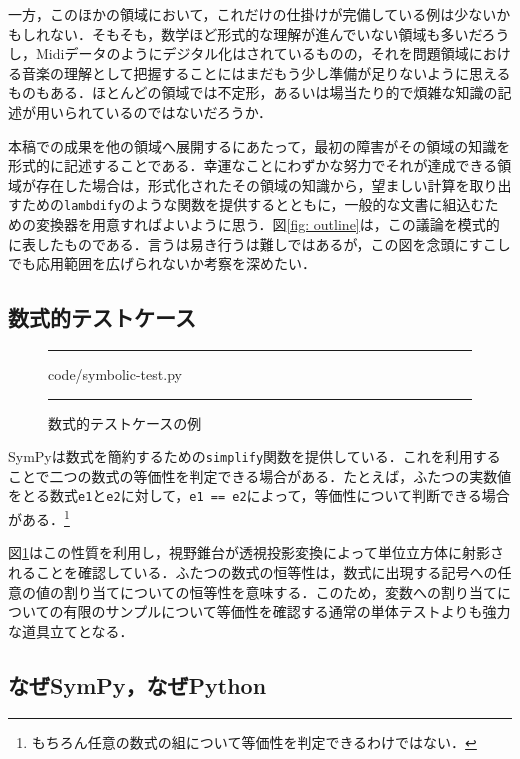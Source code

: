 一方，このほかの領域において，これだけの仕掛けが完備している例は少ないかもしれない．そもそも，数学ほど形式的な理解が進んでいない領域も多いだろうし，Midiデータのようにデジタル化はされているものの，それを問題領域における音楽の理解として把握することにはまだもう少し準備が足りないように思えるものもある．ほとんどの領域では不定形，あるいは場当たり的で煩雑な知識の記述が用いられているのではないだろうか．

本稿での成果を他の領域へ展開するにあたって，最初の障害がその領域の知識を形式的に記述することである．幸運なことにわずかな努力でそれが達成できる領域が存在した場合は，形式化されたその領域の知識から，望ましい計算を取り出すための\verb|lambdify|のような関数を提供するとともに，一般的な文書に組込むための変換器を用意すればよいように思う．図\ref {fig: outline}は，この議論を模式的に表したものである．言うは易き行うは難しではあるが，この図を念頭にすこしでも応用範囲を広げられないか考察を深めたい．

\subsection {数式的テストケース}

\begin {figure}
  \rule {\linewidth} {1pt}
  \bgroup \small \color {darkred}
   {code/symbolic-test.py} \egroup

  \caption {数式的テストケースの例}
  \label {fig: symbolic test}
  \rule {\linewidth} {1pt}
\end {figure}

SymPyは数式を簡約するための\verb|simplify|関数を提供している．これを利用することで二つの数式の等価性を判定できる場合がある．たとえば，ふたつの実数値をとる数式\verb|e1|と\verb|e2|に対して，\verb|e1 == e2|によって，等価性について判断できる場合がある．\footnote {もちろん任意の数式の組について等価性を判定できるわけではない．}

図\ref {fig: symbolic test}はこの性質を利用し，視野錐台が透視投影変換によって単位立方体に射影されることを確認している．ふたつの数式の恒等性は，数式に出現する記号への任意の値の割り当てについての恒等性を意味する．このため，変数への割り当てについての有限のサンプルについて等価性を確認する通常の単体テストよりも強力な道具立てとなる．

\subsection {なぜSymPy，なぜPython}

